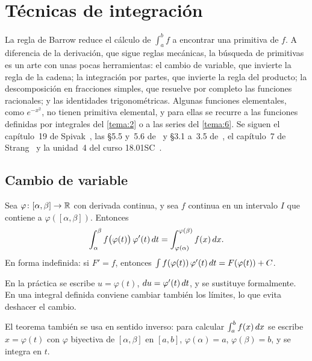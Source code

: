 \chapter{Técnicas de integración}
\label{tema:3}

La regla de Barrow reduce el cálculo de $\int_a^b f$ a encontrar una primitiva de $f$. A diferencia de la derivación, que sigue reglas mecánicas, la búsqueda de primitivas es un arte con unas pocas herramientas: el cambio de variable, que invierte la regla de la cadena; la integración por partes, que invierte la regla del producto; la descomposición en fracciones simples, que resuelve por completo las funciones racionales; y las identidades trigonométricas. Algunas funciones elementales, como $e^{-x^{2}}$, no tienen primitiva elemental, y para ellas se recurre a las funciones definidas por integrales del \cref{tema:2} o a las series del \cref{tema:6}. Se siguen el capítulo~19 de Spivak~\cite{spivak}, las §5.5 y~5.6 de~\cite{openstax1} y §3.1 a~3.5 de~\cite{openstax2}, el capítulo~7 de Strang~\cite{strang} y la unidad~4 del curso 18.01SC~\cite{mit1801}.

\section{Cambio de variable}

\begin{teorema}\label{teo:sustitucion}
Sea $\varphi\colon[\alpha,\beta]\to\mathbb{R}$ con derivada continua, y sea $f$ continua en un intervalo $I$ que contiene a $\varphi([\alpha,\beta])$. Entonces
\[
\int_{\alpha}^{\beta}f\bigl(\varphi(t)\bigr)\,\varphi'(t)\mathop{}\!d t=\int_{\varphi(\alpha)}^{\varphi(\beta)}f(x)\mathop{}\!d x .
\]
En forma indefinida: si $F'=f$, entonces $\int f(\varphi(t))\,\varphi'(t)\mathop{}\!d t=F(\varphi(t))+C$.
\end{teorema}

En la práctica se escribe $u=\varphi(t)$, $\mathop{}\!d u=\varphi'(t)\mathop{}\!d t$, y se sustituye formalmente. En una integral definida conviene cambiar también los límites, lo que evita deshacer el cambio.

\addtocounter{definicion}{1}%

El teorema también se usa en sentido inverso: para calcular $\int_a^b f(x)\mathop{}\!d x$ se escribe $x=\varphi(t)$ con $\varphi$ biyectiva de $[\alpha,\beta]$ en $[a,b]$, $\varphi(\alpha)=a$, $\varphi(\beta)=b$, y se integra en $t$.

